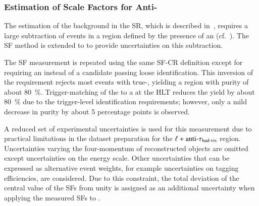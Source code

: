 

\subsubsection{Estimation of \Faketauhadvis Scale Factors for Anti-\tauhadvis}

The estimation of the \multijet background in the \hadhad SR, which is described
in~, requires a large subtraction of \ttbarFakes events
in a region defined by the presence of an \antitau
(cf.~). The SF method is extended to \antitau to
provide uncertainties on this subtraction.

The SF measurement is repeated using the same SF-CR definition except for
requiring an \antitau instead of a \tauhadvis candidate passing loose
identification.
This inversion of the \tauid requirement rejects most \ttbar events with
true-\tauhadvis, yielding a region with \ttbarFakes purity of about
\SI{80}{\percent}. Trigger-matching of the \antitau to a \tauhadvis at the HLT
reduces the \ttbarFakes yield by about \SI{80}{\percent} due to the
trigger-level identification requirements; however, only a mild decrease in
\ttbarFakes purity by about 5 percentage points is observed.

A reduced set of experimental uncertainties is used for this measurement due to
practical limitations in the dataset preparation for the
$\ell + \text{anti-}\tau_{\text{had-vis}}$ region. Uncertainties varying the four-momentum
of reconstructed objects are omitted except uncertainties on the \tauhadvis
energy scale. Other uncertainties that can be expressed as alternative event
weights, for example uncertainties on tagging efficiencies, are considered. Due
to this constraint, the total deviation of the central value of the SFs from
unity is assigned as an additional uncertainty when applying the measured SFs to
\antitau.

